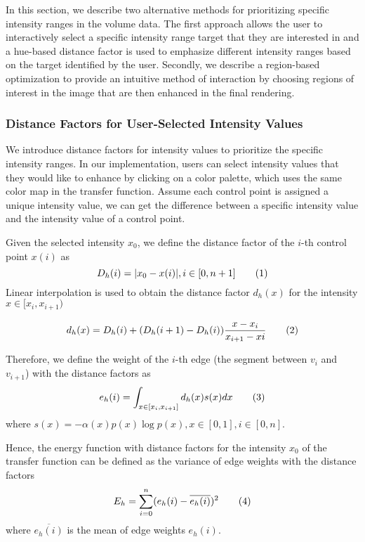 In this section, we describe two alternative methods for prioritizing specific intensity ranges in the volume data. The first approach allows the user to interactively select a specific intensity range target that they are interested in and a hue-based distance factor is used to emphasize different intensity ranges based on the target identified by the user. Secondly, we describe a region-based optimization to provide an intuitive method of interaction by choosing regions of interest in the image that are then enhanced in the final rendering.

\subsubsection{Distance Factors for User-Selected Intensity Values}


We introduce distance factors for intensity values to prioritize the specific intensity ranges.
In our implementation, users can select intensity values that they would like to enhance by clicking on a color palette, which uses the same color map in the transfer function.
Assume each control point is assigned a unique intensity value, we can get the difference between a specific intensity value and the intensity value of a control point.

Given the selected intensity $ x_{0} $, we define the distance factor of the $ i $-th control point $ x(i) $ as
\[  D_{h}(i)=|x_{0}-x(i)|, i \in [0,n+1] 
\addtag \]
Linear interpolation is used to obtain the distance factor $ d_{h}(x) $ for the intensity $ x \in [x_{i},x_{i+1}) $

\[ d_{h}(x)=D_{h}(i) + (D_{h}(i+1)-D_{h}(i))\frac{x-x_{i}}{x_{i+1}-x{i}} 
\addtag \]

Therefore, we define the weight of the $ i $-th edge (the segment between $ v_{i} $ and $ v_{i+1} $) with the distance factors as
\[
e_{h}(i)=\int_{x \in [x_{i}, x_{i+1}]} d_{h}(x)s(x) dx
\addtag \]
where $ s(x)=-\alpha(x)p(x) \log p(x), x \in [0,1], i \in [0,n]$.

Hence, the energy function with distance factors for the intensity $ x_{0} $ of the transfer function can be defined as the variance of edge weights with the distance factors
\[
E_{h}=\sum_{i=0}^{n}(e_{h}(i)-\overline{e_{h}(i)})^{2}
\addtag \]
where $ \overline{e_{h}(i)} $ is the mean of edge weights $e_{h}(i)$.

